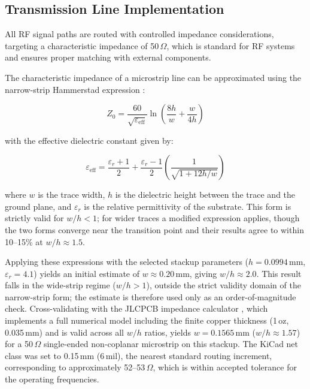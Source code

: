 \subsection{Transmission Line Implementation}

All RF signal paths are routed with controlled impedance considerations, targeting a characteristic impedance of 50\,$\Omega$, which is standard for RF systems and ensures proper matching with external components.

The characteristic impedance of a microstrip line can be approximated using the narrow-strip Hammerstad expression \cite{pozar}:

\begin{equation}
Z_0 = \frac{60}{\sqrt{\varepsilon_{\text{eff}}}}
\ln \left( \frac{8h}{w} + \frac{w}{4h} \right)
\end{equation}

with the effective dielectric constant given by:

\begin{equation}
\varepsilon_{\text{eff}} = \frac{\varepsilon_r + 1}{2}
+ \frac{\varepsilon_r - 1}{2}
\left( \frac{1}{\sqrt{1 + 12h/w}} \right)
\end{equation}

where $w$ is the trace width, $h$ is the dielectric height between the trace and the ground plane, and $\varepsilon_r$ is the relative permittivity of the substrate. This form is strictly valid for $w/h < 1$; for wider traces a modified expression applies, though the two forms converge near the transition point and their results agree to within 10--15\% at $w/h \approx 1.5$.

Applying these expressions with the selected stackup parameters ($h = 0.0994$\,mm, $\varepsilon_r = 4.1$) yields an initial estimate of $w \approx 0.20$\,mm, giving $w/h \approx 2.0$. This result falls in the wide-strip regime ($w/h > 1$), outside the strict validity domain of the narrow-strip form; the estimate is therefore used only as an order-of-magnitude check. Cross-validating with the JLCPCB impedance calculator \cite{jlcpcb_impedance}, which implements a full numerical model including the finite copper thickness (1\,oz, 0.035\,mm) and is valid across all $w/h$ ratios, yields $w = 0.1565$\,mm ($w/h \approx 1.57$) for a 50\,$\Omega$ single-ended non-coplanar microstrip on this stackup. The KiCad net class was set to 0.15\,mm (6\,mil), the nearest standard routing increment, corresponding to approximately 52--53\,$\Omega$, which is within accepted tolerance for the operating frequencies.

